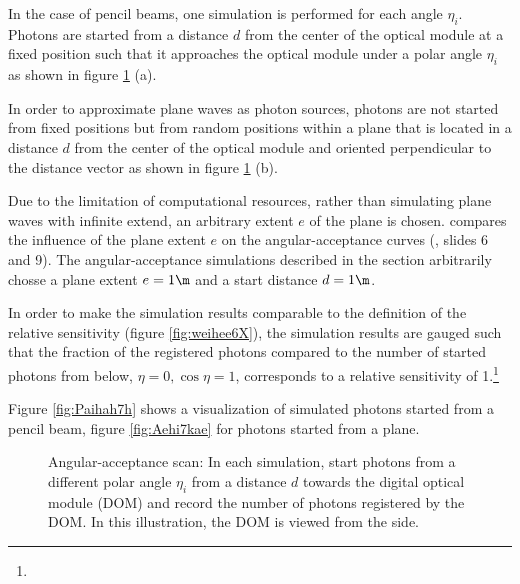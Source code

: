 In the case of pencil beams, one simulation is performed for each angle $\eta_i$. Photons are started from a distance $d$ from the center of the optical module at a fixed position such that it approaches the optical module under a polar angle $\eta_i$ as shown in figure \ref{fig:quie8Oof} (a).

In order to approximate plane waves as photon sources, photons are not started from fixed positions but from random positions within a plane that is located in a distance $d$ from the center of the optical module and oriented perpendicular to the distance vector as shown in figure \ref{fig:quie8Oof} (b).

Due to the limitation of computational resources, rather than simulating plane waves with infinite extend, an arbitrary extent $e$ of the plane is chosen.  \cite{martindardupdate} compares the influence of the plane extent $e$ on the angular-acceptance curves (\cite{martindardupdate}, slides 6 and 9). The angular-acceptance simulations described in the section arbitrarily chosse a plane extent $e = 1\m$ and a start distance $d = 1\m$.

In order to make the simulation results comparable to the definition of the relative sensitivity (figure \ref{fig:weihee6X}), the simulation results are gauged such that the fraction of the registered photons compared to the number of started photons from below, $\eta = 0, \cos \eta = 1$, corresponds to a relative sensitivity of 1.\footnote{}

Figure \ref{fig:Paihah7h} shows a  visualization of simulated photons started from a pencil beam, figure \ref{fig:Aehi7kae} for photons started from a plane.


\begin{figure}[htbp]
  \hfill
  \caption{Angular-acceptance scan: In each simulation, start photons from a different polar angle $\eta_i$ from a distance $d$ towards the digital optical module (DOM) and record the number of photons registered by the DOM. In this illustration, the DOM is viewed from the side.}
  \label{fig:quie8Oof}
\end{figure}

